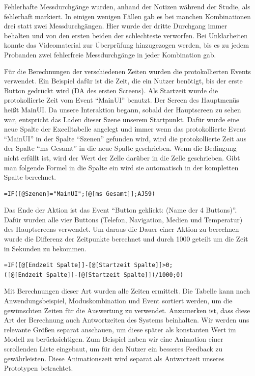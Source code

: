 Fehlerhafte Messdurchgänge wurden, anhand der Notizen während der Studie, als fehlerhaft markiert. 
In einigen wenigen Fällen gab es bei manchen Kombinationen drei statt zwei Messdurchgängen. 
Hier wurde der dritte Durchgang immer behalten und von den ersten beiden der schlechteste verworfen. 
Bei Unklarheiten konnte das Videomaterial zur Überprüfung hinzugezogen werden, bis es zu jedem Probanden zwei fehlerfreie Messdurchgänge in jeder Kombination gab. 

Für die Berechnungen der verschiedenen Zeiten wurden die protokollierten Events verwendet. 
Ein Beispiel dafür ist die Zeit, die ein Nutzer benötigt, bis der erste Button gedrückt wird (DA des ersten Screens).
Als Startzeit wurde die protokollierte Zeit vom Event "`MainUI"' benutzt. 
Der Screen des Hauptmenüs heißt MainUI.
Da unsere Interaktion begann, sobald der Hauptscreen zu sehen war, entspricht das Laden dieser Szene unserem Startpunkt. 
Dafür wurde eine neue Spalte der Excelltabelle angelegt und immer wenn das protokollierte Event "`MainUI"' in der Spalte "`Szenen"' gefunden wird, wird die protokollierte Zeit aus der Spalte "`ms Gesamt"' in die neue Spalte geschrieben. 
Wenn die Bedingung nicht erfüllt ist, wird der Wert der Zelle darüber in die Zelle geschrieben. 
Gibt man folgende Formel in die Spalte ein wird sie automatisch in der kompletten Spalte berechnet.  

\begin{lstlisting}
=IF([@Szenen]="MainUI";[@[ms Gesamt]];AJ59)
\end{lstlisting}

Das Ende der Aktion ist das Event "`Button geklickt: (Name der 4 Buttons)"'. 
Dafür wurden alle vier Buttons (Telefon, Navigation, Medien und Temperatur) des Hauptscreens verwendet. 
Um daraus die Dauer einer Aktion zu berechnen wurde die Differenz der Zeitpunkte berechnet und durch 1000 geteilt um die Zeit in Sekunden zu bekommen.

\begin{lstlisting}
=IF([@[Endzeit Spalte]]-[@[Startzeit Spalte]]>0;
([@[Endzeit Spalte]]-[@[Startzeit Spalte]])/1000;0)
\end{lstlisting}

Mit Berechnungen dieser Art wurden alle Zeiten ermittelt. Die Tabelle kann nach Anwendungsbeispiel, Moduskombination und Event sortiert werden, um die gewünschten Zeiten für die Auswertung zu verwendet. 
Anzumerken ist, dass diese Art der Berechnung auch Antwortzeiten des Systems beinhalten. 
Wir werden uns relevante Größen separat anschauen, um diese später als konstanten Wert im Modell zu berücksichtigen. 
Zum Beispiel haben wir eine Animation einer scrollenden Liste eingebaut, um für den Nutzer ein besseres Feedback zu gewährleisten. 
Diese Animationszeit wird separat als Antwortzeit unseres Prototypen betrachtet. 

